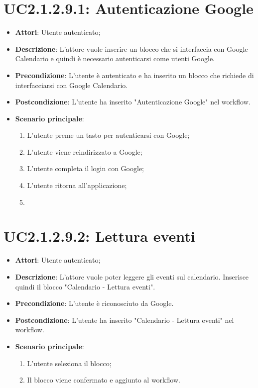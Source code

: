 \section{UC2.1.2.9.1: Autenticazione Google}
\label{UC2.1.2.9.1}
\begin{itemize}
	\item \textbf{Attori}: Utente autenticato;
	\item \textbf{Descrizione}: L'attore vuole inserire un blocco che si interfaccia con Google Calendario e quindi è necessario autenticarsi come utenti Google.
	\item \textbf{Precondizione}: L'utente è autenticato e ha inserito un blocco che richiede di interfacciarsi con Google Calendario.
	\item \textbf{Postcondizione}: L'utente ha inserito "Autenticazione Google" nel workflow.
	\item \textbf{Scenario principale}:
	\begin{enumerate} \item L'utente preme un tasto per autenticarsi con Google;  \item  L'utente viene reindirizzato a Google;  \item  L'utente completa il login con Google;  \item  L'utente ritorna all'applicazione;  \item \end{enumerate}
\end{itemize}

\section{UC2.1.2.9.2: Lettura eventi}
\label{UC2.1.2.9.2}
\begin{itemize}
	\item \textbf{Attori}: Utente autenticato;
	\item \textbf{Descrizione}: L'attore vuole poter leggere gli eventi sul calendario. Inserisce quindi il blocco "Calendario - Lettura eventi".
	\item \textbf{Precondizione}: L'utente è riconosciuto da Google.
	\item \textbf{Postcondizione}: L'utente ha inserito "Calendario - Lettura eventi" nel workflow.
	\item \textbf{Scenario principale}:
	\begin{enumerate} \item L'utente seleziona il blocco;  \item  Il blocco viene confermato e aggiunto al workflow.\end{enumerate}
\end{itemize}

